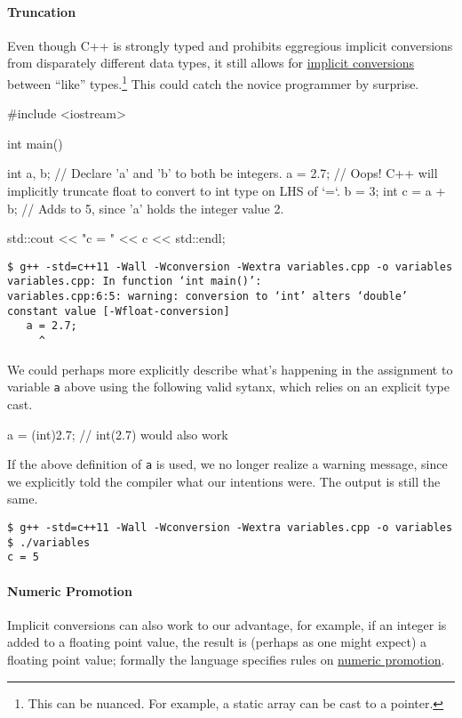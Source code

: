 \documentclass[12pt,letterpaper,twoside]{article}
\begin{document}
\paragraph{Truncation}
Even though C++ is strongly typed and prohibits eggregious implicit
conversions from disparately different data types, it still allows for
\href{https://en.cppreference.com/w/c/language/conversion}{implicit
  conversions} between ``like'' types.\footnote{This can be
  nuanced. For example, a static array can be cast to a pointer.}
This could catch the novice programmer by surprise.
\begin{cpp}
#include <iostream>

int main() {
  int a, b;   // Declare 'a' and 'b' to both be integers.
  a = 2.7;    // Oops! C++ will implicitly truncate float to convert to int type on LHS of `=`.
  b = 3;
  int c = a + b;  // Adds to 5, since 'a' holds the integer value 2.

  std::cout << "c = " << c << std::endl;
}
\end{cpp}

\begin{verbatim}
$ g++ -std=c++11 -Wall -Wconversion -Wextra variables.cpp -o variables
variables.cpp: In function ‘int main()’:
variables.cpp:6:5: warning: conversion to ‘int’ alters ‘double’ constant value [-Wfloat-conversion]
   a = 2.7;
     ^
\end{verbatim}

We could perhaps more explicitly describe what's happening in the
assignment to variable \texttt{a} above using the following valid
sytanx, which relies on an explicit type cast.

\begin{cpp}
  a = (int)2.7; // int(2.7) would also work
\end{cpp}

If the above definition of \texttt{a} is used, we no longer realize a
warning message, since we explicitly told the compiler what our
intentions were. The output is still the same.

\begin{verbatim}
$ g++ -std=c++11 -Wall -Wconversion -Wextra variables.cpp -o variables
$ ./variables 
c = 5
\end{verbatim}

\paragraph{Numeric Promotion}
Implicit conversions can also work to our
advantage, for example, if an integer is added
to a floating point value, the result is (perhaps as one might expect)
a floating point value; formally the language specifies rules on
\href{https://en.cppreference.com/w/cpp/language/implicit_conversion}{numeric promotion}.
\end{document}

